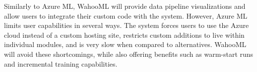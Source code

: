 \documentclass[../proposal.tex]{subfiles}
\begin{document}
Similarly to Azure ML, WahooML will provide data pipeline visualizations and
allow users to integrate their custom code with the system. However, Azure ML
limits user capabilities in several ways. The system forces users to use the
Azure cloud instead of a custom hosting site, restricts custom additions to
live within individual modules, and is very slow when compared to alternatives.
WahooML will avoid these shortcomings, while also offering benefits such as
warm-start runs and incremental training capabilities.
\end{document}
